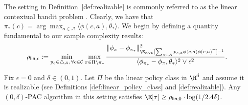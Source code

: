 \documentclass{article}
\newcommand{\mc}[1]{\mathcal{#1}}
\newcommand{\lalit}[1]{\textcolor{blue}{}}
\newcommand{\1}{\mathbf{1}}
\begin{document}
\noindent The setting in Definition~\ref{def:realizable} is commonly referred to as the linear contextual bandit problem \cite{abbasi2011improved}.
Clearly, we have that $\pi_*(c) = \arg\max_{a \in \mc{A}} \langle \phi(c,a) , \theta_* \rangle$. We begin by defining a quantity fundamental to our sample complexity results:
\begin{align*}%
    \rho_{ {\sf lin},\epsilon} := \min_{p_c  \in \triangle_{\mc{A}}, \, \forall c \in \mc{C}} \max_{\pi \in \Pi \setminus \pi_*} \frac{ \| \phi_\pi - \phi_{\pi_*} \|^2_{\E_{c \sim \nu}[ \sum_{a \in \mc{A}} p_{c,a} \phi(c,a) \phi(c,a)^{\top} ]^{-1}} }{ \langle \phi_{\pi_*} - \phi_\pi , \theta_* \rangle^2 \vee \epsilon^2 }. 
\end{align*}

\begin{theorem}\label{thm:linear_lower_bound}
Fix $\epsilon=0$ and $\delta \in (0,1)$. 
Let $\Pi$ be the linear policy class in $\R^d$ and assume it is realizable (see Definitions \ref{def:linear_policy_class} and \ref{def:realizable}).
Any $(0,\delta)$-PAC algorithm in this setting satisfies $\E[\tau] \geq \rho_{ {\sf lin},0} \cdot \log(1/2.4\delta)$.
\end{theorem}
\end{document}
